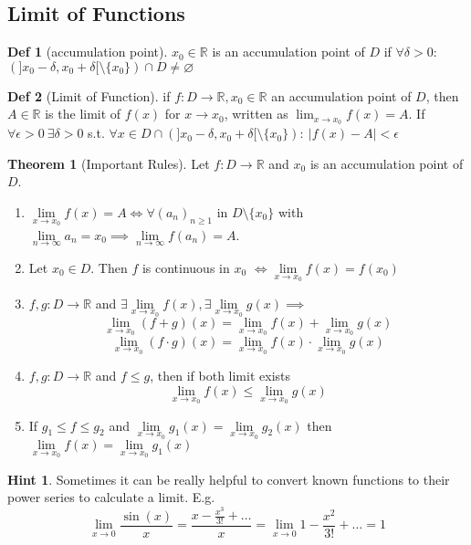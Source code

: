 \documentclass[a4paper, 10pt]{article}
\theoremstyle{definition}
\newtheorem*{definition}{Def}
\newtheorem*{note_wrapper}{Hint}
\theoremstyle{ex}
\theoremstyle{named}
\newtheorem*{ntheorem_wrapper}{Theorem}
\newenvironment{ntheorem}%
    {\begin{mdframed}[style=important]\begin{ntheorem_wrapper}}%
    {\end{ntheorem_wrapper}\end{mdframed}}
\newenvironment{note}%
    {\begin{mdframed}[style=trick]\begin{note_wrapper}}%
    {\end{note_wrapper}\end{mdframed}}
\newcommand{\R}{\mathbb{R}}
\begin{document}
\subsection{Limit of Functions}
\begin{definition}[accumulation point]
    $x_0 \in \R$ is an accumulation point of $D$ if $\forall \delta > 0$: $(]x_0 - \delta, x_0 + \delta[ \setminus \{x_0\}) \cap D \neq \varnothing$
\end{definition}

\begin{definition}[Limit of Function]
    if $f : D \to \R, x_0 \in \R$ an accumulation point of $D$, then $A \in \R$ is the limit of $f(x)$ for $x \to x_0$, written as $\lim_{x \to x_0} f(x) = A$. If $\forall \epsilon > 0 \ \exists \delta > 0$ s.t. $\forall x \in D \cap (]x_0 - \delta, x_0 + \delta[ \setminus \{x_0\}): \ |f(x) - A| < \epsilon$
\end{definition}

\begin{ntheorem}[Important Rules]
    Let $f: D \to \R$ and $x_0$ is an accumulation point of $D$.
    \begin{enumerate}
        \item $\lim\limits_{x \to x_0} f(x) = A \iff \forall (a_n)_{n \geq 1}$ in $D \setminus \{x_0\}$ with $\lim\limits_{n \to \infty} a_n = x_0 \implies \lim\limits_{n \to \infty} f(a_n) = A$.
        \item Let $x_0 \in D$. Then $f$ is continuous in $x_0$ \newline $\iff \lim\limits_{x \to x_0} f(x) = f(x_0)$
        \item $f, g: D \to \R$ and $\exists \lim\limits_{x \to x_0} f(x), \exists \lim\limits_{x \to x_0} g(x) \implies$
        $$\lim_{x \to x_0} (f + g)(x) = \lim_{x \to x_0} f(x) + \lim_{x \to x_0} g(x)$$
        $$\lim_{x \to x_0} (f \cdot g) (x) = \lim_{x \to x_0}f(x) \cdot \lim_{x \to x_0} g(x)$$
        \item $f, g: D \to \R$ and $f \leq g$, then if both limit exists
        $$\lim_{x \to x_0} f(x) \leq \lim_{x \to x_0} g(x)$$ 
        \item If $g_1 \leq f \leq g_2$ and $\lim\limits_{x \to x_0} g_1(x) = \lim\limits_{x \to x_0} g_2(x)$ then $\lim\limits_{x \to x_0} f(x) = \lim\limits_{x \to x_0} g_1(x)$
    \end{enumerate}
\end{ntheorem}

\begin{note}
    Sometimes it can be really helpful to convert known functions to their power series to calculate a limit. E.g.
    $$\lim_{x \to 0} \frac{\sin(x)}{x} = \frac{x - \frac{x^3}{3!} + \ldots}{x} = \lim_{x \to 0} 1 - \frac{x^2}{3!} + \ldots = 1$$
\end{note}
\end{document}
